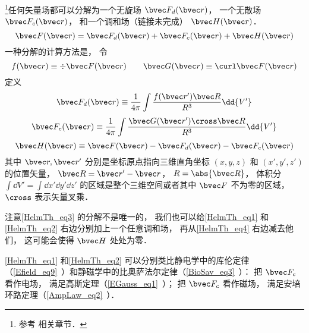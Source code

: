 
\begin{issues}
\issueTODO
\end{issues}


\footnote{参考 \cite{GriffE} 相关章节．}任何矢量场都可以分解为一个无旋场 $\bvec F_{d}(\bvec r)$， 一个无散场 $\bvec F_{c}(\bvec r)$， 和一个调和场（链接未完成） $\bvec H(\bvec r)$．
\begin{equation}\label{HelmTh_eq3}
\bvec F(\bvec r) = \bvec F_{d}(\bvec r) + \bvec F_{c}(\bvec r) + \bvec H(\bvec r)
\end{equation}
一种分解的计算方法是， 令
\begin{equation}
f(\bvec r) \equiv \div \bvec F(\bvec r) \qquad
\bvec G(\bvec r) \equiv \curl \bvec F(\bvec r)
\end{equation}
定义
\begin{equation}\label{HelmTh_eq1}
\bvec F_{d}(\bvec r) \equiv \frac{1}{4\pi}\int \frac{f(\bvec r') \bvec R}{R^3} \dd{V'}
\end{equation}
\begin{equation}\label{HelmTh_eq2}
\bvec F_{c}(\bvec r) \equiv \frac{1}{4\pi}\int \frac{\bvec G(\bvec r')\cross \bvec R}{R^3} \dd{V'}
\end{equation}
\begin{equation}\label{HelmTh_eq4}
\bvec H(\bvec r) \equiv \bvec F(\bvec r) - \bvec F_{d}(\bvec r) - \bvec F_{c}(\bvec r)
\end{equation}
其中 $\bvec r, \bvec r'$ 分别是坐标原点指向三维直角坐标 $(x, y, z)$ 和 $(x', y', z')$ 的位置矢量， $\bvec R = \bvec r' - \bvec r$， $R = \abs{\bvec R}$， 体积分 $\int\dd{V'} = \int\dd{x'}\dd{y'}\dd{z'}$ 的区域是整个三维空间或者其中 $\bvec F$ 不为零的区域， $\cross$ 表示矢量叉乘．

注意\autoref{HelmTh_eq3} 的分解不是唯一的， 我们也可以给\autoref{HelmTh_eq1} 和\autoref{HelmTh_eq2} 右边分别加上一个任意调和场， 再从\autoref{HelmTh_eq4} 右边减去他们， 这可能会使得 $\bvec H$ 处处为零．

\autoref{HelmTh_eq1} 和\autoref{HelmTh_eq2} 可以分别类比静电学中的库伦定律（\autoref{Efield_eq9}~）和静磁学中的比奥萨法尔定律（\autoref{BioSav_eq3}~）： 把 $\bvec F_c$ 看作电场， 满足高斯定理（\autoref{EGauss_eq1}~）； 把 $\bvec F_c$ 看作磁场， 满足安培环路定理（\autoref{AmpLaw_eq2}~）．

